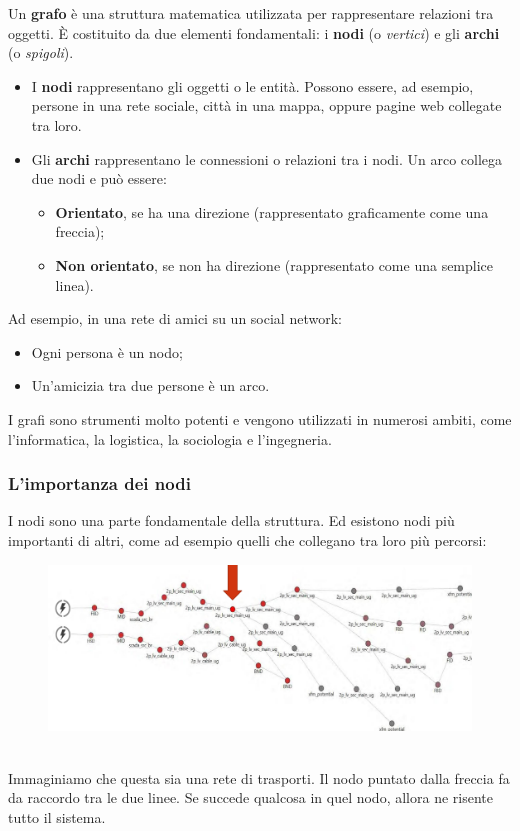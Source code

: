 Un \textbf{grafo} è una struttura matematica utilizzata per rappresentare relazioni tra oggetti. È costituito da due elementi fondamentali: i \textbf{nodi} (o \emph{vertici}) e gli \textbf{archi} (o \emph{spigoli}).

\begin{itemize}
    \item I \textbf{nodi} rappresentano gli oggetti o le entità. Possono essere, ad esempio, persone in una rete sociale, città in una mappa, oppure pagine web collegate tra loro.
    \item Gli \textbf{archi} rappresentano le connessioni o relazioni tra i nodi. Un arco collega due nodi e può essere:
    \begin{itemize}
        \item \textbf{Orientato}, se ha una direzione (rappresentato graficamente come una freccia);
        \item \textbf{Non orientato}, se non ha direzione (rappresentato come una semplice linea).
    \end{itemize}
\end{itemize}

Ad esempio, in una rete di amici su un social network:
\begin{itemize}
    \item Ogni persona è un nodo;
    \item Un'amicizia tra due persone è un arco.
\end{itemize}

I grafi sono strumenti molto potenti e vengono utilizzati in numerosi ambiti, come l’informatica, la logistica, la sociologia e l’ingegneria.



\subsubsection*{L'importanza dei nodi}

I nodi sono una parte fondamentale della struttura. Ed esistono nodi più importanti di altri, come ad esempio quelli che collegano tra loro più percorsi:
\\
\begin{figure}[th]
    \centering
    \includegraphics[scale=0.4]{Introduction/img/nodeimportant.png}
    \label{fig:nodeIMP}
\end{figure}
\\
Immaginiamo che questa sia una rete di trasporti. Il nodo puntato dalla freccia fa da raccordo tra le due linee. Se succede qualcosa in quel nodo, allora ne risente tutto il sistema. 
\newpage
